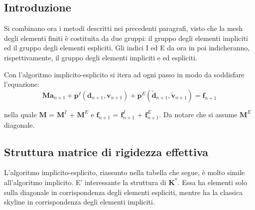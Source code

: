 \subsection{Introduzione}
Si combinano ora i metodi descritti nei precedenti paragrafi, visto che la mesh degli elementi finiti
è costituita da due gruppi: il gruppo degli elementi impliciti ed il gruppo degli elementi espliciti. 
Gli indici I ed E da ora in poi indicheranno, rispettivamente, 
il gruppo degli elementi impliciti e ed espliciti.

Con l'algoritmo implicito-esplicito si itera ad ogni passo in modo da soddisfare l'equazione:
\begin{equation}
	\boldsymbol{M a}_{n+1} + \boldsymbol{p}^I(\boldsymbol{d}_{n+1}, \boldsymbol{v}_{n+1}) + \boldsymbol{p}^E(\tilde{\boldsymbol{d}}_{n+1}, \tilde{\boldsymbol{v}}_{n+1}) = \boldsymbol{f}_{n+1}
\end{equation}

nella quale $\boldsymbol{M}$ = $\boldsymbol{M}^I$ + $\boldsymbol{M}^E$ e $\boldsymbol{f}_{n+1}$ = $\boldsymbol{f}_{n+1}^I$ + $\boldsymbol{f}_{n+1}^E$. 
Da notare che si assume $\boldsymbol{M}^E$ diagonale.

\subsection{Struttura matrice di rigidezza effettiva}
L'algoritmo implicito-esplicito, riassunto nella tabella che segue, è molto simile all'algoritmo implicito. E' interessante la struttura di $\boldsymbol{K}^*$. Essa ha elementi solo sulla diagonale in corrispondenza degli elementi espliciti, mentre ha la classica skyline in corrispondenza degli elementi impliciti. 

